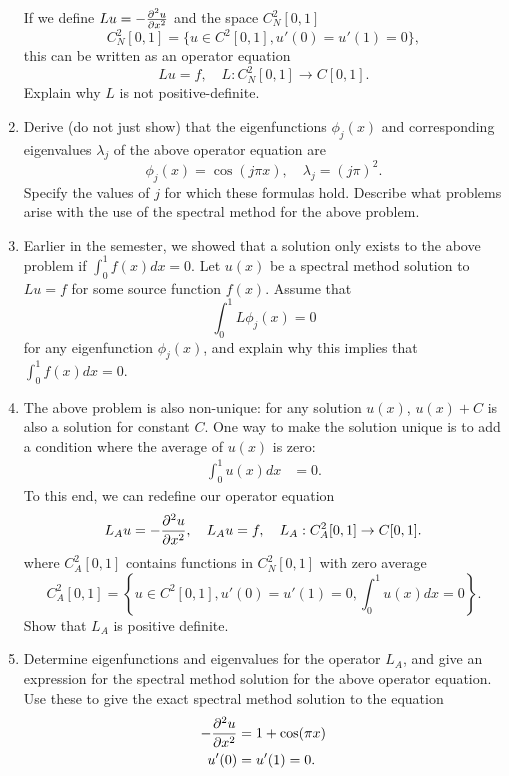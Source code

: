 \begin{enumerate}
If we define $Lu = -\frac{\partial^2u}{\partial x^2}$ and the space $C^2_N[0,1]$
\[
C^2_{ N}[0,1] = \{u\in C^2[0,1], u'(0) = u'(1) = 0\},
\]
this can be written as an operator equation
\[
Lu = f, \quad L:C^2_{ N}[0,1] \rightarrow C[0,1].
\]
Explain why $L$ is not positive-definite.  
\item Derive (do not just show) that the eigenfunctions $\phi_j(x)$ and corresponding eigenvalues $\lambda_j$ of the above operator equation are
\[
\phi_j(x) = \cos(j\pi x), \quad \lambda_j = (j\pi)^2.
\]
Specify the values of $j$ for which these formulas hold.  Describe what problems arise with the use of the spectral method for the above problem.  %
\item Earlier in the semester, we showed that a solution only exists to the above problem if $\int_0^1 f(x)dx = 0.$  Let $u(x)$ be a spectral method solution to $Lu = f$ for some source function $f(x)$.  Assume that
\[
\int_0^1 L\phi_j(x) = 0
\]
for any eigenfunction $\phi_j(x)$, and explain why this implies that $\int_0^1 f(x) dx =0$.
\item The above problem is also non-unique: for any solution $u(x)$, $u(x) + C$ is also a solution for constant $C$.  One way to make the solution unique is to add a condition where the average of $u(x)$ is zero: 
\begin{align*}
\int_0^1 u(x)dx &= 0.
\end{align*}
To this end, we can redefine our operator equation 
\[
L_Au = -\frac{\partial^2u}{\partial x^2}, \quad L_Au = f, \quad L_A:C^2_{A}[0,1] \rightarrow C[0,1].
\]
where $C^2_A[0,1]$ contains functions in $C^2_N[0,1]$  with zero average
\[
C^2_{A}[0,1] = \left\{u\in C^2[0,1], u'(0) = u'(1) = 0, \int_0^1 u(x) dx = 0\right\}.
\]
Show that $L_A$ is positive definite.
\item Determine eigenfunctions and eigenvalues for the operator $L_A$, and give an expression for the spectral method solution for the above operator equation.  Use these to give the exact spectral method solution to the equation 
\begin{align*}
-\frac{\partial^2u}{\partial x^2} &= 1 + \cos(\pi x)\\
u'(0) &= u'(1) = 0.
\end{align*}
\end{enumerate}

